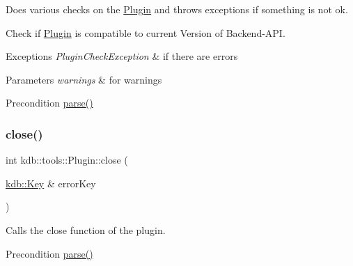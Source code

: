 Does various checks on the \mbox{\hyperlink{classkdb_1_1tools_1_1Plugin}{Plugin}} and throws exceptions if something is not ok. 


\begin{DoxyItemize}
\item Check if \mbox{\hyperlink{classkdb_1_1tools_1_1Plugin}{Plugin}} is compatible to current Version of Backend-\/\+A\+PI.
\end{DoxyItemize}


\begin{DoxyExceptions}{Exceptions}
{\em Plugin\+Check\+Exception} & if there are errors \\
\hline
\end{DoxyExceptions}

\begin{DoxyParams}{Parameters}
{\em warnings} & for warnings\\
\hline
\end{DoxyParams}
\begin{DoxyPrecond}{Precondition}
\mbox{\hyperlink{classkdb_1_1tools_1_1Plugin_adfcba2fbdeb436a1083410df804d5fb0}{parse()}} 
\end{DoxyPrecond}
\mbox{\label{classkdb_1_1tools_1_1Plugin_a40b5fd413f3f6da735680ed8d7c8a6a2}} 
\subsubsection{\texorpdfstring{close()}{close()}}
{\footnotesize\ttfamily int kdb\+::tools\+::\+Plugin\+::close (\begin{DoxyParamCaption}\item[{\mbox{\hyperlink{classkdb_1_1Key}{kdb\+::\+Key}} \&}]{error\+Key }\end{DoxyParamCaption})}



Calls the close function of the plugin. 

\begin{DoxyPrecond}{Precondition}
\mbox{\hyperlink{classkdb_1_1tools_1_1Plugin_adfcba2fbdeb436a1083410df804d5fb0}{parse()}} 
\end{DoxyPrecond}
\mbox{\label{classkdb_1_1tools_1_1Plugin_ac1a731f0fa0628a51ca9edf6385e8c3d}} 
